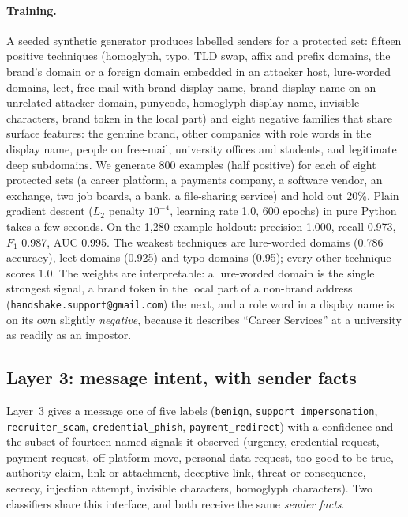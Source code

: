 \documentclass[10pt,twocolumn]{article}
\newcommand{\code}[1]{\texttt{#1}}
\begin{document}
\paragraph{Training.} A seeded synthetic generator produces labelled senders for a protected set: fifteen positive techniques (homoglyph, typo, TLD swap, affix and prefix domains, the brand's domain or a foreign domain embedded in an attacker host, lure-worded domains, leet, free-mail with brand display name, brand display name on an unrelated attacker domain, punycode, homoglyph display name, invisible characters, brand token in the local part) and eight negative families that share surface features: the genuine brand, other companies with role words in the display name, people on free-mail, university offices and students, and legitimate deep subdomains. We generate 800 examples (half positive) for each of eight protected sets (a career platform, a payments company, a software vendor, an exchange, two job boards, a bank, a file-sharing service) and hold out 20\%. Plain gradient descent ($L_2$ penalty $10^{-4}$, learning rate 1.0, 600 epochs) in pure Python takes a few seconds. On the 1{,}280-example holdout: precision 1.000, recall 0.973, $F_1$ 0.987, AUC 0.995. The weakest techniques are lure-worded domains (0.786 accuracy), leet domains (0.925) and typo domains (0.95); every other technique scores 1.0. The weights are interpretable: a lure-worded domain is the single strongest signal, a brand token in the local part of a non-brand address (\code{handshake.support@gmail.com}) the next, and a role word in a display name is on its own slightly \emph{negative}, because it describes ``Career Services'' at a university as readily as an impostor.

\subsection{Layer 3: message intent, with sender facts}
\label{sec:l3}

Layer~3 gives a message one of five labels (\code{benign}, \code{support\_impersonation}, \code{recruiter\_scam}, \code{credential\_phish}, \code{payment\_redirect}) with a confidence and the subset of fourteen named signals it observed (urgency, credential request, payment request, off-platform move, personal-data request, too-good-to-be-true, authority claim, link or attachment, deceptive link, threat or consequence, secrecy, injection attempt, invisible characters, homoglyph characters). Two classifiers share this interface, and both receive the same \emph{sender facts}.
\end{document}
